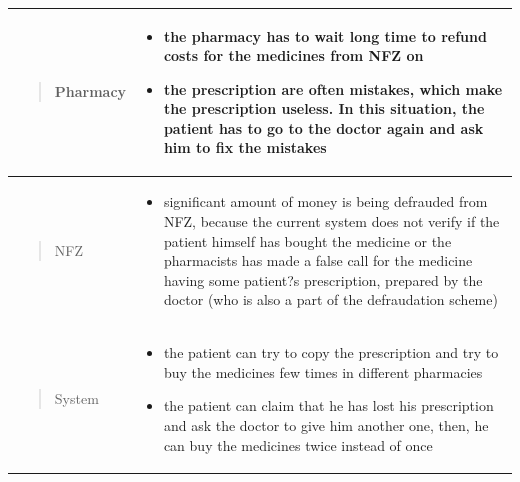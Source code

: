 \begin{longtable}{|p{3cm}|p{9cm}|}
     \hline
     \vspace*{\fill} \begin{quote} \centering Pharmacy \end{quote} \vspace*{\fill} & \begin{itemize}
     \item the pharmacy has to wait long time to refund
     costs for the medicines from NFZ on \newline
     \item the prescription are often mistakes, which make
     the prescription useless. In this situation, the
     patient has to go to the doctor again and ask
     him to fix the mistakes
     \end{itemize}
     \\ \hline


  \hline
  \vspace*{\fill} \begin{quote} \centering NFZ \end{quote} \vspace*{\fill} & \begin{itemize}
  \item significant amount of money is being defrauded
  from NFZ, because the current system does not
  verify if the patient himself has bought the
  medicine or the pharmacists has made a false
  call for the medicine having some patient?s prescription,
  prepared by the doctor (who is also a
  part of the defraudation scheme)
  \end{itemize}
  \\ \hline


    \hline
    \vspace*{\fill} \begin{quote} \centering System  \end{quote} \vspace*{\fill} & \begin{itemize}
    \item the patient can try to copy the prescription and
    try to buy the medicines few times in different
    pharmacies \newline
    \item the patient can claim that he has lost his prescription
    and ask the doctor to give him another
    one, then, he can buy the medicines twice instead
    of once
    \end{itemize}
    \\ \hline

\end{longtable}

